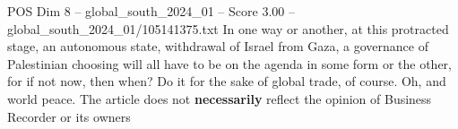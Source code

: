 \begin{textsample}{POS Dim 8 – global\_south\_2024\_01 – Score 3.00 – global\_south\_2024\_01/105141375.txt}
In one way or another, at this protracted stage, an autonomous state, withdrawal of Israel from Gaza, a governance of Palestinian choosing will all have to be on the agenda in some form or the other, for if not now, then when?
Do it for the sake of global trade, of course.
Oh, and world peace.
The article does not \textbf{necessarily} reflect the opinion of Business Recorder or its owners

\end{textsample}
